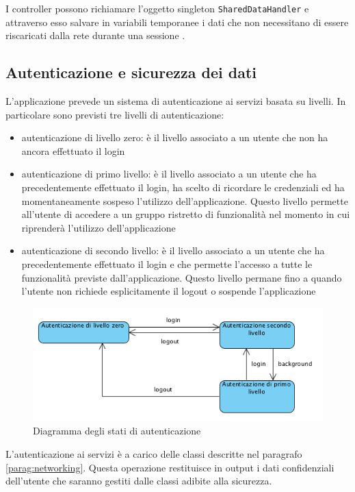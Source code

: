 I controller possono richiamare l'oggetto singleton \texttt{SharedDataHandler} e attraverso esso salvare in variabili temporanee i dati che non necessitano di essere riscaricati dalla rete durante una sessione .

\subsection{Autenticazione e sicurezza dei dati}
L'applicazione prevede un sistema di autenticazione ai servizi basata su livelli. In particolare sono previsti tre livelli di autenticazione:
\begin{itemize}
 \item autenticazione di livello zero: è il livello associato a un utente che non ha ancora effettuato il login
 \item autenticazione di primo livello: è il livello associato a un utente che ha precedentemente effettuato il login, ha scelto di ricordare le credenziali ed ha momentaneamente sospeso l'utilizzo dell'applicazione. Questo livello permette all'utente di accedere a un gruppo ristretto di funzionalità nel momento in cui riprenderà l'utilizzo dell'applicazione
 \item autenticazione di secondo livello: è il livello associato a un utente che ha precedentemente effettuato il login e che permette l'accesso a tutte le funzionalità previste dall'applicazione. Questo livello permane fino a quando l'utente non richiede esplicitamente il logout o sospende l'applicazione
\end{itemize}

\begin{figure}[!htbp]
\centering
\includegraphics[scale=0.70]{architettura/stati.png}
\caption{Diagramma degli stati di autenticazione}
\end{figure}


L'autenticazione ai servizi è a carico delle classi descritte nel paragrafo \ref{parag:networking}. Questa operazione restituisce in output i dati confidenziali dell'utente che saranno gestiti dalle classi adibite alla sicurezza.

